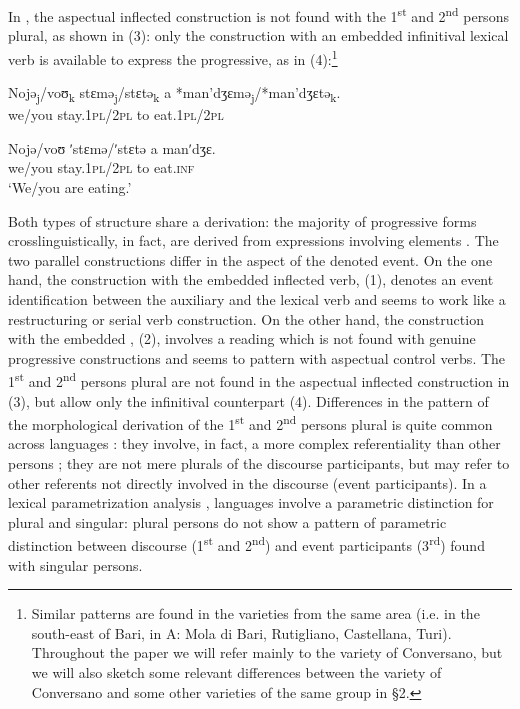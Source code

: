 \documentclass[output=paper]{langsci/langscibook}
\begin{document}
In , the aspectual inflected construction is not found with the 1\textsuperscript{st} and 2\textsuperscript{nd} persons plural, as shown in (3): only the construction with an embedded infinitival lexical verb is available to express the progressive, as in (4):\footnote{Similar patterns are found in the varieties from the same area (i.e. in the south-east of Bari, in A: Mola di Bari, Rutigliano, Castellana, Turi). Throughout the paper we will refer mainly to the variety of Conversano, but we will also sketch some relevant differences between the variety of Conversano and some other varieties of the same group in §2.}

\ea%
    \label{ex:lorusso:3}
    \gll Nojə\textsubscript{j}/voʊ\textsubscript{k}   stɛmə\textsubscript{j}/stɛtə\textsubscript{k}   a   *man’dʒɛmə\textsubscript{j}/*man’dʒɛtə\textsubscript{k}.\\
         we/you  stay.\textsc{1pl}/\textsc{2pl} to   eat.\textsc{1pl}/\textsc{2pl} \\
    \z


\ea%
    \label{ex:lorusso:4}
    \gll Nojə/voʊ   ʹstɛmə/ʹstɛtə   a  manʹdʒɛ.\\
         we/you   stay.\textsc{1pl}/\textsc{2pl} to   eat.\textsc{inf}\\
    \glt ‘We/you are eating.’
    \z


Both types of structure share a  derivation: the majority of progressive forms crosslinguistically, in fact, are derived from expressions involving  elements  \citep{Bybee1994,Mateu1999,Laka2006}. The two parallel constructions differ in the aspect of the denoted event. On the one hand, the construction with the embedded inflected verb, (1), denotes an event identification between the auxiliary and the lexical verb and seems to work like a restructuring or serial verb construction. On the other hand, the construction with the embedded , (2), involves a  reading which is not found with genuine progressive constructions \citep{Chierchia1995} and seems to pattern with aspectual control verbs. The 1\textsuperscript{st} and 2\textsuperscript{nd} persons plural are not found in the aspectual inflected construction in (3), but allow only the infinitival counterpart (4). Differences in the pattern of the morphological derivation of the 1\textsuperscript{st} and 2\textsuperscript{nd} persons plural is quite common across  languages \citep{Manzini2005,Manzini2011Bio}: they involve, in fact, a more complex referentiality than other persons \citep{Bobaljik2008Missing}; they are not mere plurals of the discourse participants, but may refer to other referents not directly involved in the discourse (event participants). In a lexical parametrization analysis \citep{Manzini2011Bio}, languages involve a parametric distinction for plural and singular: plural persons do not show a pattern of parametric distinction between discourse (1\textsuperscript{st} and 2\textsuperscript{nd}) and event participants (3\textsuperscript{rd}) found with singular persons. 
\end{document}
